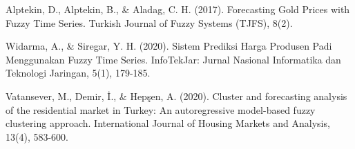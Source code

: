 \documentclass[conference]{IEEEtran}
\begin{document}
\begin{thebibliography}{00}
 Alptekin, D., Alptekin, B., \& Aladag, C. H. (2017). Forecasting Gold Prices with Fuzzy Time Series. Turkish Journal of Fuzzy Systems (TJFS), 8(2).

 Widarma, A., \& Siregar, Y. H. (2020). Sistem Prediksi Harga Produsen Padi Menggunakan Fuzzy Time Series. InfoTekJar: Jurnal Nasional Informatika dan Teknologi Jaringan, 5(1), 179-185.

 Vatansever, M., Demir, İ., \& Hepşen, A. (2020). Cluster and forecasting analysis of the residential market in Turkey: An autoregressive model-based fuzzy clustering approach. International Journal of Housing Markets and Analysis, 13(4), 583-600.


\end{thebibliography}
\end{document}
